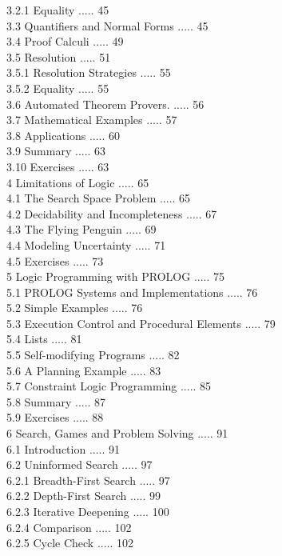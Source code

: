 \documentclass[10pt]{book}
\begin{document}
3.2.1 Equality ..... 45\\
3.3 Quantifiers and Normal Forms ..... 45\\
3.4 Proof Calculi ..... 49\\
3.5 Resolution ..... 51\\
3.5.1 Resolution Strategies ..... 55\\
3.5.2 Equality ..... 55\\
3.6 Automated Theorem Provers. ..... 56\\
3.7 Mathematical Examples ..... 57\\
3.8 Applications ..... 60\\
3.9 Summary ..... 63\\
3.10 Exercises ..... 63\\
4 Limitations of Logic ..... 65\\
4.1 The Search Space Problem ..... 65\\
4.2 Decidability and Incompleteness ..... 67\\
4.3 The Flying Penguin ..... 69\\
4.4 Modeling Uncertainty ..... 71\\
4.5 Exercises ..... 73\\
5 Logic Programming with PROLOG ..... 75\\
5.1 PROLOG Systems and Implementations ..... 76\\
5.2 Simple Examples ..... 76\\
5.3 Execution Control and Procedural Elements ..... 79\\
5.4 Lists ..... 81\\
5.5 Self-modifying Programs ..... 82\\
5.6 A Planning Example ..... 83\\
5.7 Constraint Logic Programming ..... 85\\
5.8 Summary ..... 87\\
5.9 Exercises ..... 88\\
6 Search, Games and Problem Solving ..... 91\\
6.1 Introduction ..... 91\\
6.2 Uninformed Search ..... 97\\
6.2.1 Breadth-First Search ..... 97\\
6.2.2 Depth-First Search ..... 99\\
6.2.3 Iterative Deepening ..... 100\\
6.2.4 Comparison ..... 102\\
6.2.5 Cycle Check ..... 102\\
\end{document}

